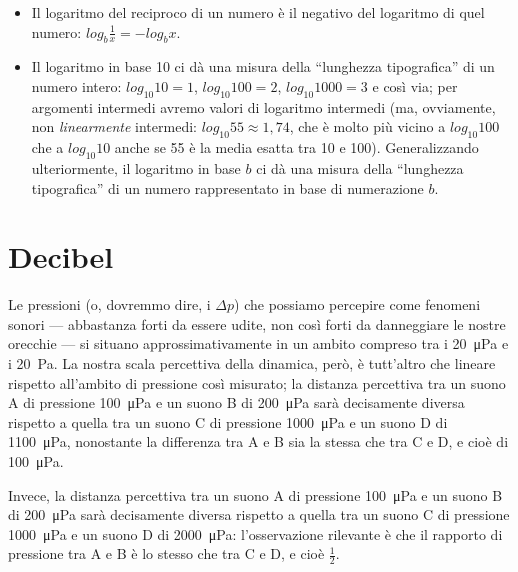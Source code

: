 \begin{itemize}
\item Il logaritmo del reciproco di un numero è il negativo del logaritmo di quel numero: $log _b \frac{1}{x} = -log _b x$.

\item Il logaritmo in base 10 ci dà una misura della ``lunghezza tipografica'' di un numero intero: $log_{10}10 = 1$, $log_{10}100 = 2$, $log_{10}1000 = 3$ e così via; per argomenti intermedi avremo valori di logaritmo intermedi (ma, ovviamente, non \emph{linearmente} intermedi: $log_{10}55 \approx 1,74$, che è molto più vicino a $log_{10}100$ che a $log_{10}10$ anche se 55 è la media esatta tra 10 e 100). Generalizzando ulteriormente, il logaritmo in base $b$ ci dà una misura della ``lunghezza tipografica'' di un numero rappresentato in base di numerazione $b$.

\end{itemize}




\section{Decibel}

Le pressioni (o, dovremmo dire, i $\Delta p$) che possiamo percepire come fenomeni sonori --- abbastanza forti da essere udite, non così forti da danneggiare le nostre orecchie --- si situano approssimativamente in un ambito compreso tra i \qty{20}{\micro\pascal} e i \qty{20}{\Pa}. La nostra scala percettiva della dinamica, però, è tutt'altro che lineare rispetto all'ambito di pressione così misurato; la distanza percettiva tra un suono A di pressione \qty{100}{\micro\pascal} e un suono B di \qty{200}{\micro\pascal} sarà decisamente diversa rispetto a quella tra un suono C di pressione \qty{1000}{\micro\pascal} e un suono D di \qty{1100}{\micro\pascal}, nonostante la differenza tra A e B sia la stessa che tra C e D, e cioè di \qty{100}{\micro\pascal}.

Invece, la distanza percettiva tra un suono A di pressione \qty{100}{\micro\pascal} e un suono B di \qty{200}{\micro\pascal} sarà decisamente diversa rispetto a quella tra un suono C di pressione \qty{1000}{\micro\pascal} e un suono D di \qty{2000}{\micro\pascal}: l'osservazione rilevante è che il rapporto di pressione tra A e B è lo stesso che tra C e D, e cioè $\frac{1}{2}$. 

